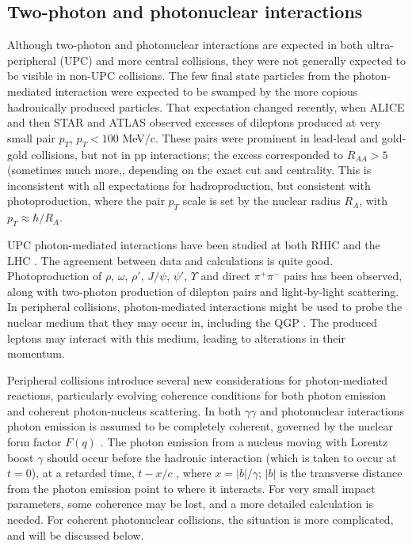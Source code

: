 \documentclass[../report.tex]{subfiles}
\begin{document}


\newpage
\subsection{Two-photon and photonuclear interactions}
\label{dileptons:peripheral}

Although two-photon and photonuclear interactions are  expected in both ultra-peripheral (UPC) and more central collisions, they were not generally expected to be visible in non-UPC collisions.  The few final state particles from the photon-mediated interaction were expected to be swamped by the more copious hadronically produced particles.   That expectation changed recently, when ALICE \cite{Adam:2015gba} and then STAR \cite{Adam:2018tdm,Zha:2018ohg} and ATLAS \cite{Aaron} observed excesses of dileptons produced at very small pair $p_T$, $p_T < 100$ MeV/c.   These pairs were prominent in lead-lead and gold-gold collisions, but not in pp interactions; the excess corresponded to $R_{AA} >5$ (sometimes much more,, depending on the exact cut and centrality.  This is inconsistent with all expectations for hadroproduction, but  consistent with photoproduction, where the pair $p_T$ scale is set by the nuclear radius $R_A$, with $p_T \approx \hbar/R_A$. 

UPC photon-mediated interactions have been studied at both RHIC and the LHC \cite{Baltz:2007kq,Bertulani:2005ru,Klein:2017nqo,Bertulani:1987tz,Baur:2001jj}.  The agreement between data and calculations is quite good.  Photoproduction of $\rho$, $\omega$, $\rho'$, $J/\psi$, $\psi'$,  $\Upsilon$ and direct $\pi^+\pi^-$ pairs has been observed, along with two-photon production of dilepton pairs and light-by-light scattering.  In peripheral collisions, photon-mediated interactions might be used to probe the nuclear medium that they may occur in, including the QGP \cite{Aaron,Adam:2018tdm}.   The produced leptons may interact with this medium, leading to alterations in their momentum.    

Peripheral collisions introduce several new considerations for  photon-mediated reactions, particularly evolving coherence conditions for both photon emission and coherent photon-nucleus scattering.  In both $\gamma\gamma$ and photonuclear interactions photon emission is assumed to be completely coherent, governed by the nuclear form factor $F(q)$ \cite{Vidovic:1992ik}.   The photon emission from a nucleus moving with Lorentz boost $\gamma$ should occur before the hadronic interaction (which is taken to occur at $t=0$), at a retarded time, $t-x/c$ \cite{Zha:2017jch}, where $x=|b|/\gamma$; $|b|$ is the transverse distance from the photon emission point to where it interacts.    For very small impact parameters, some coherence may be lost, and a more detailed calculation is needed.  For coherent photonuclear collisions, the situation is more complicated, and will be discussed below. 
\end{document}
